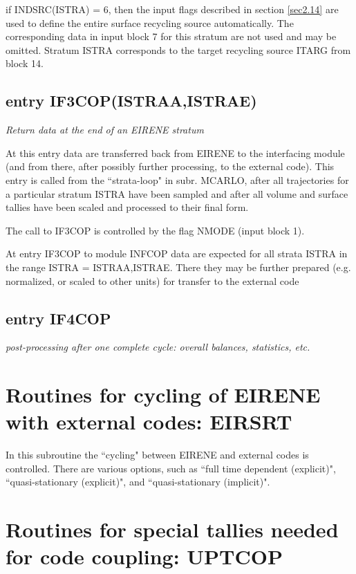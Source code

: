 \medskip

if INDSRC(ISTRA) = 6, then the input flags described in section \ref{sec2.14}
are used to define the entire surface recycling source automatically. The
corresponding data in input block 7 for this stratum are not used and
may be omitted. Stratum ISTRA corresponds to the target recycling source
ITARG from block 14.

\subsection{entry IF3COP(ISTRAA,ISTRAE)}  \label{sec4.1.3}
{\sl Return data at the end of an EIRENE stratum}

\medskip

At this entry data are transferred back from EIRENE to the
interfacing module (and from there, after possibly further processing, to the external code). This entry is called from the ``strata-loop" in subr.
MCARLO, after all trajectories for a particular stratum ISTRA have
been sampled and after all volume and surface tallies have been
scaled and processed to their final form.

The call to IF3COP is controlled by the flag NMODE (input block 1).

At entry IF3COP to module INFCOP data are expected
for all strata ISTRA in the range ISTRA = ISTRAA,ISTRAE.
There they may be further prepared (e.g. normalized, or scaled to other units)
for transfer to the external code

\subsection{entry IF4COP} \label{sec4.1.4}
{\sl post-processing after one complete cycle: overall balances, statistics, etc.}

\section{Routines for cycling of EIRENE with external codes: EIRSRT}
\label{sec4.2}

In this subroutine the ``cycling" between EIRENE and external
codes is controlled. There are various options, such as
 ``full time dependent
(explicit)", ``quasi-stationary (explicit)", and
``quasi-stationary (implicit)".

\section{Routines for special tallies needed for code coupling:
UPTCOP}
\label{sec4.3}

